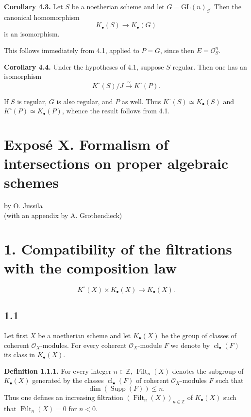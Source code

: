 \documentclass[11pt]{article}
\newcommand{\cl}{\operatorname{cl}}
\providecommand{\Supp}{\operatorname{Supp}}
\begin{document}
\textbf{Corollary 4.3.} Let $S$ be a noetherian scheme and let $G=\mathrm{GL}(n)_S$. Then the canonical homomorphism
\[
 K_\bullet(S)\longrightarrow K_\bullet(G)
\]
is an isomorphism.

This follows immediately from 4.1, applied to $P=G$, since then $E=\mathcal O_S^n$.

\textbf{Corollary 4.4.} Under the hypotheses of 4.1, suppose $S$ regular. Then one has an isomorphism
\[
 K^\circ(S)/J\xrightarrow{\sim}K^\circ(P).
\]

If $S$ is regular, $G$ is also regular, and $P$ as well. Thus $K^\circ(S)\simeq K_\bullet(S)$ and $K^\circ(P)\simeq K_\bullet(P)$, whence the result follows from 4.1.



\providecommand{\Filt}{\operatorname{Filt}}
\providecommand{\Coh}{\operatorname{Coh}}
\providecommand{\Ob}{\operatorname{Ob}}
\providecommand{\longg}{\operatorname{long}}
\providecommand{\degtr}{\operatorname{deg.tr}}
\providecommand{\Frac}{\operatorname{Frac}}
\providecommand{\fpqc}{\mathrm{fpqc}}
\providecommand{\Sch}{\operatorname{Sch}}
\providecommand{\Picf}{\operatorname{Pic}}
\providecommand{\Ens}{\operatorname{Ens}}
\providecommand{\im}{\operatorname{Im}}

\section*{Exposé X. Formalism of intersections on proper algebraic schemes}
\begin{center}
by O. Jussila\\
(with an appendix by A. Grothendieck)
\end{center}

\section*{1. Compatibility of the filtrations with the composition law}
\[
K^\circ(X)\times K_\bullet(X)\longrightarrow K_\bullet(X).
\]

\subsection*{1.1}
Let first $X$ be a noetherian scheme and let $K_\bullet(X)$ be the group of classes of coherent $\mathcal O_X$-modules. For every coherent $\mathcal O_X$-module $F$ we denote by $\cl_\bullet(F)$ its class in $K_\bullet(X)$.

\textbf{Definition 1.1.1.} For every integer $n\in\mathbb Z$, $\Filt_n(X)$ denotes the subgroup of $K_\bullet(X)$ generated by the classes $\cl_\bullet(F)$ of coherent $\mathcal O_X$-modules $F$ such that
\[
\dim(\Supp(F))\leq n.
\]
Thus one defines an increasing filtration $(\Filt_n(X))_{n\in\mathbb Z}$ of $K_\bullet(X)$ such that $\Filt_n(X)=0$ for $n<0$.
\end{document}
